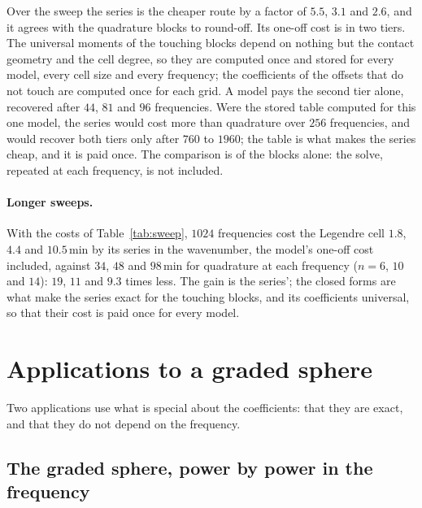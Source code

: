 \documentclass[11pt,a4paper]{article}
\begin{document}
Over the sweep the series is the cheaper route by a factor of $5.5$, $3.1$ and $2.6$, and it agrees with the
quadrature blocks to round-off. Its one-off cost is in two tiers. The universal moments of the touching blocks
depend on nothing but the contact geometry and the cell degree, so they are computed once and stored for every
model, every cell size and every frequency; the coefficients of the offsets that do not touch are computed
once for each grid. A model pays the second tier alone, recovered after $44$, $81$ and $96$ frequencies. Were
the stored table computed for this one model, the series would cost more than quadrature over $256$
frequencies, and would recover both tiers only after $760$ to $1960$; the table is what makes the series
cheap, and it is paid once. The comparison is of the blocks alone: the solve, repeated at each frequency, is
not included.

\paragraph{Longer sweeps.} With the costs of Table~\ref{tab:sweep}, $1024$ frequencies cost
the Legendre cell $1.8$, $4.4$ and $10.5$\,min by its series in the wavenumber, the model's one-off cost
included, against $34$, $48$ and $98$\,min for quadrature at each frequency ($n=6$, $10$ and $14$): $19$, $11$
and $9.3$ times less. The gain is the series'; the closed forms are what make the series exact for the touching
blocks, and its coefficients universal, so that their cost is paid once for every model.

\section{Applications to a graded sphere}\label{sec:applications}

Two applications use what is special about the coefficients: that they are exact, and that they do
not depend on the frequency.

\subsection{The graded sphere, power by power in the frequency}\label{sec:sphereseries}
\end{document}
